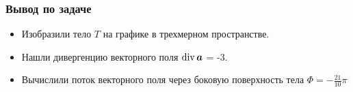 \begin{frame}\frametitle{Вывод по задаче}
	\begin{itemize}
		\item Изобразили тело \(T\) на графике в трехмерном пространстве.

		\item Нашли дивергенцию векторного поля \(\Div \vec a\) = -3.

		\item Вычислили поток векторного поля через боковую поверхность тела \(\Phi = -\frac{21}{10}\pi \)
	\end{itemize}

\end{frame}
